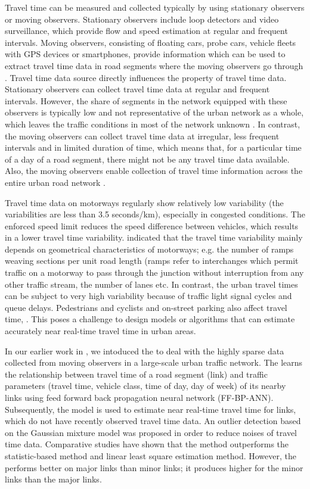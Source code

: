 \documentclass[journal]{IEEEtran}
\begin{document}
Travel time can be measured and collected typically by using stationary observers or moving observers. Stationary observers include loop detectors and video surveillance, which provide flow and speed estimation at regular and frequent intervals. Moving observers, consisting of floating cars, probe cars, vehicle fleets with GPS devices or smartphones, provide information which can be used to extract travel time data in road segments where the moving observers go through \cite{Ma2008}. Travel time data source directly influences the property of travel time data. Stationary observers can collect travel time data at regular and frequent intervals. However, the share of segments in the network equipped with these observers is typically low and not representative of the urban network as a whole, which leaves the traffic conditions in most of the network unknown \cite{Jenelius2013}. In contrast, the moving observers can collect travel time data at irregular, less frequent intervals and in limited duration of time, which means that, for a particular time of a day of a road segment, there might not be any travel time data available. Also, the moving observers enable collection of travel time information across the entire urban road network \cite{Jones2013, Ma2008}. 

Travel time data on motorways regularly show relatively low variability (the variabilities are less than 3.5 seconds/km), especially in congested conditions. The enforced speed limit reduces the speed difference between vehicles, which results in a lower travel time variability. \cite{Tu2006} indicated that the travel time variability mainly depends on geometrical characteristics of motorways; e.g. the number of ramps weaving sections per unit road length (ramps refer to interchanges which permit traffic on a motorway to pass through the junction without interruption from any other traffic stream, the number of lanes etc. In contrast, the urban travel times can be subject to very high variability because of traffic light signal cycles and queue delays. Pedestrians and cyclists and on-street parking also affect travel time, \cite{Hinsbergen2011a, Ma2008}. This poses a challenge to design models or algorithms that can estimate accurately near real-time travel time in urban areas.

In our earlier work in \cite{Vu2017}, we intoduced the \nlim to deal with the highly sparse data collected from moving observers in a large-scale urban traffic network. The \nlim learns the relationship between travel time of a road segment (link) and traffic parameters (travel time, vehicle class, time of day, day of week) of its nearby links using feed forward back propagation neural network (FF-BP-ANN). Subsequently, the \nlim model is used to estimate near real-time travel time for links, which do not have recently observed travel time data. An outlier detection based on the Gaussian mixture model was proposed in order to reduce noises of travel time data. Comparative studies have shown that the \nlim method outperforms the statistic-based method and linear least square estimation method. However, the \nlim performs better on major links than minor links; it produces higher \mape for the minor links than the major links. 
\end{document}
